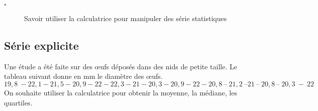 \begin{titreTice}

\end{titreTice}


\begin{CpsCol}
\begin{description}
\item[$\square$] Savoir utiliser la calculatrice pour manipuler des série statistiques
\end{description}
\end{CpsCol}

\subsection*{Série explicite}

Une étude a été faite sur des œufs déposés dans des nids de petite taille.
Le tableau suivant donne en mm le diamètre des œufs.
$$19,8 ~ - 22,1 - 21,5 - 20,9 - 22 - 22,3 - 21 - 20,3 - 20,9 - 22 - 20,8 ~ – ~ 21,2 ~ – 21 ~ – ~ 20,8 ~ – ~  20,3 ~ - ~ 22$$
On souhaite utiliser la calculatrice pour obtenir la moyenne, la médiane, les quartiles.



